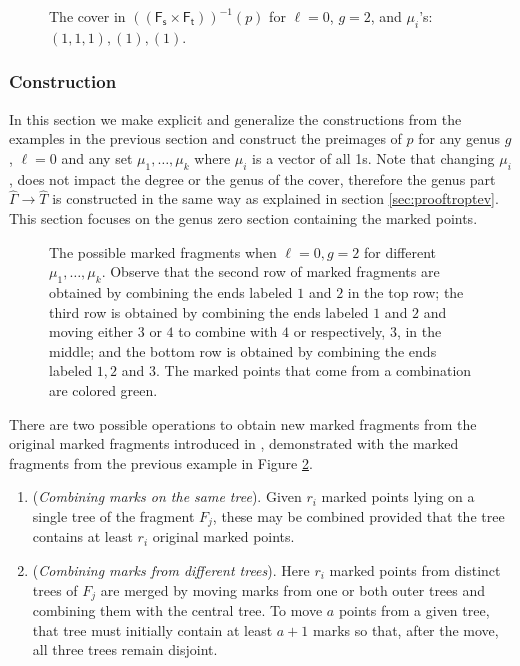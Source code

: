 \documentclass[11pt,reqno]{amsart}
\newcommand{\inputTikZ}[2]{%
     \resizebox{#1}{!}{}}
\theoremstyle{definition}
\newcommand{\Ft}{\mathsf{F_t}}
\newcommand{\Fs}{\mathsf{F_s}}
\newcommand{\gGamma}{\widehat{\Gamma}}
\newcommand{\gT}{\widehat{T}}
\begin{document}
        
        \begin{figure}[tb]
        \centering
        \inputTikZ{.3\textwidth}{Figures/l=0g=2_1,1,1_}
        \caption{The cover in $((\Fs\times\Ft))^{-1}(p)$ for $\ell=0$, $g=2$, and $\mu_i$'s: $(1,1,1),(1),(1).$}
        \label{fig:l=0g=2(1,1,1)}
    \end{figure}

    
    \subsubsection*{Construction}
In this section we make explicit and generalize the constructions from the examples in the previous section and construct the preimages of $p$ for any genus $g$, $\ell=0$ and any set $\mu_1,\dots,\mu_k$ where $\mu_i$ is a vector of all 1s. Note that changing $\mu_i$, does not impact the degree or the genus of the cover, therefore the genus part $\gGamma\to\gT$ is constructed in the same way as explained in section \ref{sec:prooftroptev}. This section focuses on the genus zero section containing the marked points.

\begin{figure}[tb]
    \centering
    \inputTikZ{.8\textwidth}{Figures/l=0g=2fragments}
    \caption{The possible marked fragments when $\ell=0, g=2$ for different $\mu_1,\dots,\mu_k$. Observe that the second row of marked fragments are obtained by combining the ends labeled $1$ and $2$ in the top row; the third row is obtained by combining the ends labeled $1$ and $2$ and moving either $3$ or $4$ to combine with $4$ or respectively, $3$, in the middle; and the bottom row is obtained by combining the ends labeled $1,2$ and $3$. The marked points that come from a combination are colored green.}
    \label{fig:l=0g=2fragments}
\end{figure}

There are two possible operations to obtain new marked fragments from the original marked fragments introduced in \cite{troptev}, demonstrated with the marked fragments from the previous example in Figure \ref{fig:l=0g=2fragments}. 

\begin{enumerate}
    \item[\textbf{Action C}] (\emph{Combining marks on the same tree}).  
    Given $r_i$ marked points lying on a single tree of the fragment $F_j$, these may be combined provided that the tree contains at least $r_i$ original marked points. 
    
    \item[\textbf{Action M}] (\emph{Combining marks from different trees}).  
    Here $r_i$ marked points from distinct trees of $F_j$ are merged by moving marks from one or both outer trees and combining them with the central tree.  
    To move $a$ points from a given tree, that tree must initially contain at least $a+1$ marks so that, after the move, all three trees remain disjoint.
\end{enumerate}
\end{document}
